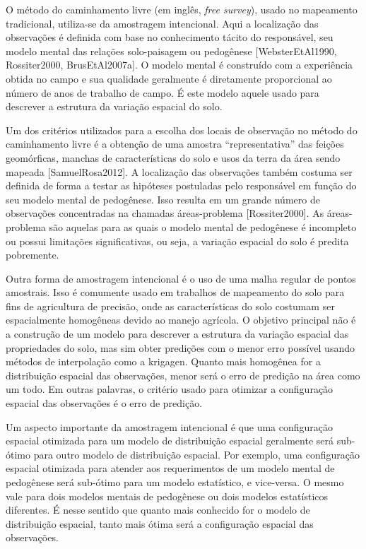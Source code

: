 \documentclass[]{book}
\begin{document}
O método do caminhamento livre (em inglês, \emph{free survey}), usado no
mapeamento tradicional, utiliza-se da amostragem intencional. Aqui a
localização das observações é definida com base no conhecimento tácito
do responsável, seu modelo mental das relações solo-paisagem ou
pedogênese {[}WebsterEtAl1990, Rossiter2000, BrusEtAl2007a{]}. O modelo
mental é construído com a experiência obtida no campo e sua qualidade
geralmente é diretamente proporcional ao número de anos de trabalho de
campo. É este modelo aquele usado para descrever a estrutura da variação
espacial do solo.

Um dos critérios utilizados para a escolha dos locais de observação no
método do caminhamento livre é a obtenção de uma amostra
``representativa'' das feições geomórficas, manchas de características
do solo e usos da terra da área sendo mapeada {[}SamuelRosa2012{]}. A
localização das observações também costuma ser definida de forma a
testar as hipóteses postuladas pelo responsável em função do seu modelo
mental de pedogênese. Isso resulta em um grande número de observações
concentradas na chamadas áreas-problema {[}Rossiter2000{]}. As
áreas-problema são aquelas para as quais o modelo mental de pedogênese é
incompleto ou possui limitações significativas, ou seja, a variação
espacial do solo é predita pobremente.

Outra forma de amostragem intencional é o uso de uma malha regular de
pontos amostrais. Isso é comumente usado em trabalhos de mapeamento do
solo para fins de agricultura de precisão, onde as características do
solo costumam ser espacialmente homogêneas devido ao manejo agrícola. O
objetivo principal não é a construção de um modelo para descrever a
estrutura da variação espacial das propriedades do solo, mas sim obter
predições com o menor erro possível usando métodos de interpolação como
a krigagen. Quanto mais homogênea for a distribuição espacial das
observações, menor será o erro de predição na área como um todo. Em
outras palavras, o critério usado para otimizar a configuração espacial
das observações é o erro de predição.

Um aspecto importante da amostragem intencional é que uma configuração
espacial otimizada para um modelo de distribuição espacial geralmente
será sub-ótimo para outro modelo de distribuição espacial. Por exemplo,
uma configuração espacial otimizada para atender aos requerimentos de um
modelo mental de pedogênese será sub-ótimo para um modelo estatístico, e
vice-versa. O mesmo vale para dois modelos mentais de pedogênese ou dois
modelos estatísticos diferentes. É nesse sentido que quanto mais
conhecido for o modelo de distribuição espacial, tanto mais ótima será a
configuração espacial das observações.
\end{document}
